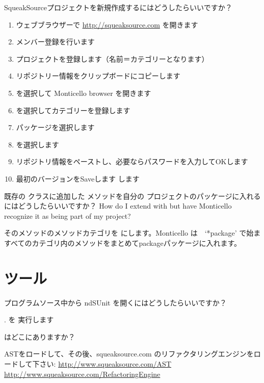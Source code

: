 \documentclass[a4paper,10pt,twoside]{book}
\begin{document}
\begin{faq}
SqueakSourceプロジェクトを新規作成するにはどうしたらいいですか？
\end{faq}
\answer
\begin{enumerate}
  \item ウェブブラウザーで \url{http://squeaksource.com} を開きます
  \item メンバー登録を行います
  \item プロジェクトを登録します（名前＝カテゴリーとなります）
  \item リポジトリー情報をクリップボードにコピーします
  \item {} を選択して Monticello browser を開きます
  \item {} を選択してカテゴリーを登録します
  \item パッケージを選択します
  \item {} を選択します
  \item リポジトリ情報をペーストし、必要ならパスワードを入力してOKします
  \item 最初のバージョンをSaveします  します
\end{enumerate}

\begin{faq}
既存の  クラスに追加した  メソッドを自分の  プロジェクトのパッケージに入れるにはどうしたらいいですか？
How do I extend  with  but have Monticello recognize it as being part of my  project?
\end{faq}
\answer
そのメソッドのメソッドカテゴリを  にします。Monticello は　‘*package’ で始ますべてのカテゴリ内のメソッドをまとめてpackageパッケージに入れます。

\section{ツール}

\begin{faq}
プログラムソース中から nd{SUnit}  を開くにはどうしたらいいですか？
\end{faq}
\answer
 . を 実行します

\begin{faq}
 はどこにありますか？ 
\end{faq}
\answer
ASTをロードして、その後、squeaksource.com のリファクタリングエンジンをロードして下さい:
\url{http://www.squeaksource.com/AST}
\url{http://www.squeaksource.com/RefactoringEngine}
\end{document}
